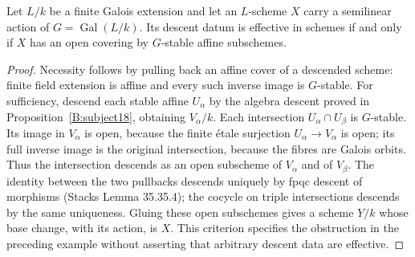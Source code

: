 \begin{proposition}\label{B:descent-criterion}
Let $L/k$ be a finite Galois extension and let an $L$-scheme $X$ carry a semilinear action of $G=\operatorname{Gal}(L/k)$. Its descent datum is effective in schemes if and only if $X$ has an open covering by $G$-stable affine subschemes.
\end{proposition}
\begin{proof}
Necessity follows by pulling back an affine cover of a descended scheme: finite field extension is affine and every such inverse image is $G$-stable. For sufficiency, descend each stable affine $U_\alpha$ by the algebra descent proved in Proposition~\ref{B:subject18}, obtaining $V_\alpha/k$. Each intersection $U_\alpha\cap U_\beta$ is $G$-stable. Its image in $V_\alpha$ is open, because the finite \'etale surjection $U_\alpha\to V_\alpha$ is open; its full inverse image is the original intersection, because the fibres are Galois orbits. Thus the intersection descends as an open subscheme of $V_\alpha$ and of $V_\beta$. The identity between the two pullbacks descends uniquely by fpqc descent of morphisms (Stacks Lemma 35.35.4); the cocycle on triple intersections descends by the same uniqueness. Gluing these open subschemes gives a scheme $Y/k$ whose base change, with its action, is $X$. This criterion specifies the obstruction in the preceding example without asserting that arbitrary descent data are effective.
\end{proof}

